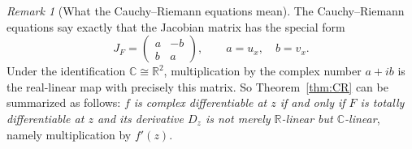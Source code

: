 \documentclass[11pt]{article}
\theoremstyle{plain}
\theoremstyle{definition}
\theoremstyle{remark}
\newtheorem*{remark}{Remark}
\numberwithin{equation}{section}
\newcommand{\be}{\begin{equation}}
\newcommand{\ee}{\end{equation}}
\newcommand{\C}{\mathbb{C}}
\newcommand{\R}{\mathbb{R}}
\begin{document}
\begin{remark}[What the Cauchy--Riemann equations mean]
	The Cauchy--Riemann equations say exactly that the Jacobian matrix has
	the special form
	\be
	J_F=\begin{pmatrix} a&-b\\ b&a\end{pmatrix},
	\qquad a=u_x,\quad b=v_x .
	\ee
	Under the identification $\C\cong\R^2$, multiplication by the complex
	number $a+ib$ is the real-linear map with precisely this matrix. So
	Theorem~\ref{thm:CR} can be summarized as follows: \emph{$f$ is complex
		differentiable at $z$ if and only if $F$ is totally differentiable at
		$z$ and its derivative $D_z$ is not merely $\R$-linear but
		$\C$-linear}, namely multiplication by $f'(z)$.  
\end{remark}

%	
%
%
%
\end{document}
